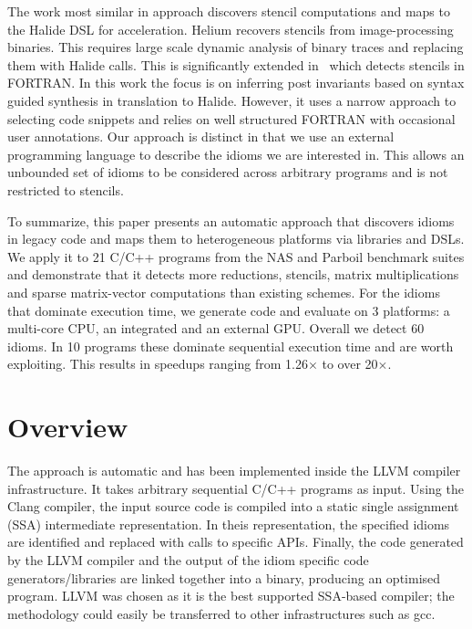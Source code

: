     The work most similar in approach discovers stencil computations and maps to
    the Halide DSL for acceleration.
    Helium \cite{Mendis2015Helium} recovers stencils from image-processing
    binaries.
    This requires large scale dynamic analysis of binary traces and replacing
    them with Halide calls. 
    This is significantly extended in~\cite{Kamil2016Verified} which detects
    stencils in FORTRAN.
    In this work the focus is on inferring post invariants based on syntax
    guided synthesis in translation to Halide.
    However, it uses a narrow approach to selecting code snippets and relies on
    well structured FORTRAN with occasional user annotations.
    Our approach is distinct in that we use an external  programming language to
    describe the idioms we are interested in.
    This allows an unbounded set of idioms  to be considered across arbitrary
    programs and is not restricted to stencils. 

    To summarize, this paper presents an automatic approach that discovers
    idioms in legacy code and maps them to heterogeneous platforms via libraries
    and DSLs.
    We apply it to 21 C/C++ programs from the NAS and Parboil benchmark suites
    and demonstrate that it detects more reductions, stencils, matrix
    multiplications and sparse matrix-vector computations than existing schemes.
    For the idioms that dominate execution time, we generate code and evaluate
    on 3 platforms: a multi-core CPU, an integrated and an external GPU.
    Overall we detect 60 idioms.
    In 10 programs these dominate sequential execution time and are worth
    exploiting.
    This results in speedups ranging from 1.26$\times$ to over 20$\times$.

\section{Overview}

    The approach is automatic and has been implemented inside the LLVM compiler
    infrastructure.
    It takes arbitrary sequential C/C++ programs as input.
    Using the Clang compiler, the input source code is compiled into a static
    single assignment (SSA) intermediate representation.
    In theis representation, the specified idioms are identified and replaced
    with calls to specific APIs.
    Finally, the code generated by the LLVM compiler and the output of the idiom
    specific code generators/libraries are linked together into a binary,
    producing an optimised program.
    LLVM was chosen as it is the best supported SSA-based compiler;
    the methodology could easily be transferred to other infrastructures such as
    gcc.


